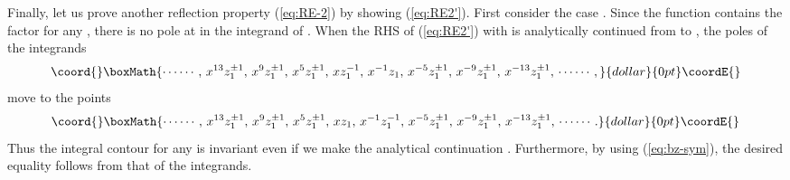 \documentclass[a4paper,10pt]{article}
\begin{document}
{Finally, let us prove another reflection property 
(\ref{eq:RE-2}) by showing (\ref{eq:RE2'}). 
First consider the case \coordHE{}. Since the 
function \coordHE{} contains the factor 
\coordHE{} for any \coordHE{}, there 
is no pole at \coordHE{} in the integrand of 
\coordHE{}. 
When the RHS of (\ref{eq:RE2'}) with \coordHE{} 
is analytically continued from \coordHE{} to 
\coordHE{}, the poles of the integrands 
$$\coord{}\boxMath{
\cdots\cdots, \, x^{13} z_{1}^{\pm 1}, \, 
x^9 z_{1}^{\pm 1}, \, x^5 z_{1}^{\pm 1}, \, 
x z_{1}^{-1}, \, x^{-1}z_{1}, 
\, x^{-5}z_{1}^{\pm 1}, \, x^{-9}z_{1}^{\pm 1}, \, 
x^{-13}z_{1}^{\pm 1}, \, \cdots\cdots , 
}{dollar}{0pt}\coordE{}$$ 
move to the points 
$$\coord{}\boxMath{
\cdots\cdots, \, x^{13} z_{1}^{\pm 1}, \, 
x^9 z_{1}^{\pm 1}, \, x^5 z_{1}^{\pm 1}, \, 
x z_{1}, \, x^{-1}z_{1}^{-1}, 
\, x^{-5}z_{1}^{\pm 1}, \, x^{-9}z_{1}^{\pm 1}, \, 
x^{-13}z_{1}^{\pm 1}, \, \cdots\cdots . 
}{dollar}{0pt}\coordE{}$$ 
Thus the integral contour \coordHE{} for any \coordHE{} is invariant 
even if we make the analytical continuation 
\coordHE{}. Furthermore, 
by using (\ref{eq:bz-sym}), the desired equality 
follows from that of the integrands. 

}
\end{document}
